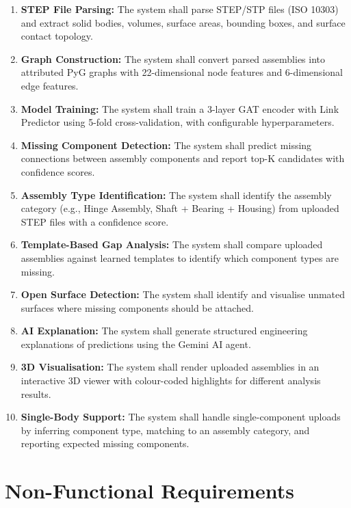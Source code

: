 \documentclass[12pt]{report}
\begin{document}
\begin{enumerate}[label=FR\arabic*.]
    \item \textbf{STEP File Parsing:} The system shall parse STEP/STP files (ISO 10303) and extract solid bodies, volumes, surface areas, bounding boxes, and surface contact topology.
    \item \textbf{Graph Construction:} The system shall convert parsed assemblies into attributed PyG graphs with 22-dimensional node features and 6-dimensional edge features.
    \item \textbf{Model Training:} The system shall train a 3-layer GAT encoder with Link Predictor using 5-fold cross-validation, with configurable hyperparameters.
    \item \textbf{Missing Component Detection:} The system shall predict missing connections between assembly components and report top-K candidates with confidence scores.
    \item \textbf{Assembly Type Identification:} The system shall identify the assembly category (e.g., Hinge Assembly, Shaft + Bearing + Housing) from uploaded STEP files with a confidence score.
    \item \textbf{Template-Based Gap Analysis:} The system shall compare uploaded assemblies against learned templates to identify which component types are missing.
    \item \textbf{Open Surface Detection:} The system shall identify and visualise unmated surfaces where missing components should be attached.
    \item \textbf{AI Explanation:} The system shall generate structured engineering explanations of predictions using the Gemini AI agent.
    \item \textbf{3D Visualisation:} The system shall render uploaded assemblies in an interactive 3D viewer with colour-coded highlights for different analysis results.
    \item \textbf{Single-Body Support:} The system shall handle single-component uploads by inferring component type, matching to an assembly category, and reporting expected missing components.
\end{enumerate}

\section{Non-Functional Requirements}
\end{document}

